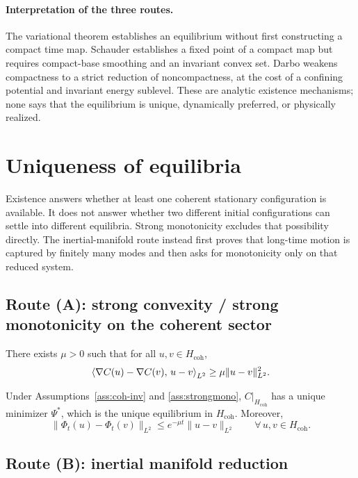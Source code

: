 \documentclass[11pt]{article}
\providecommand{\Hcoh}{H_{\mathrm{coh}}}
\begin{document}
\paragraph{Interpretation of the three routes.}
The variational theorem establishes an equilibrium without first constructing
a compact time map.  Schauder establishes a fixed point of a compact map but
requires compact-base smoothing and an invariant convex set.  Darbo weakens
compactness to a strict reduction of noncompactness, at the cost of a
confining potential and invariant energy sublevel.  These are analytic
existence mechanisms; none says that the equilibrium is unique, dynamically
preferred, or physically realized.

\section{Uniqueness of equilibria}

Existence answers whether at least one coherent stationary configuration is
available.  It does not answer whether two different initial configurations
can settle into different equilibria.  Strong monotonicity excludes that
possibility directly.  The inertial-manifold route instead first proves that
long-time motion is captured by finitely many modes and then asks for
monotonicity only on that reduced system.

\subsection{Route (A): strong convexity / strong monotonicity on the coherent sector}

\begin{assumption}[Strong monotonicity on $\Hcoh$]\label{ass:strongmono}
There exists $\mu>0$ such that for all $u,v\in \Hcoh$,
\[
\left\langle \nabla C(u)-\nabla C(v),\,u-v \right\rangle_{L^2}\ge \mu \|u-v\|_{L^2}^2.
\]
\end{assumption}

\begin{theorem}\label{thm:uniqueH}
Under Assumptions~\ref{ass:coh-inv} and \ref{ass:strongmono}, $C|_{\Hcoh}$ has a unique minimizer $\Psi^\ast$,
which is the unique equilibrium in $\Hcoh$. Moreover,
\[
\|\Phi_t(u)-\Phi_t(v)\|_{L^2}\le e^{-\mu t}\|u-v\|_{L^2}\qquad \forall\,u,v\in\Hcoh.
\]
\end{theorem}

\subsection{Route (B): inertial manifold reduction}
\end{document}
